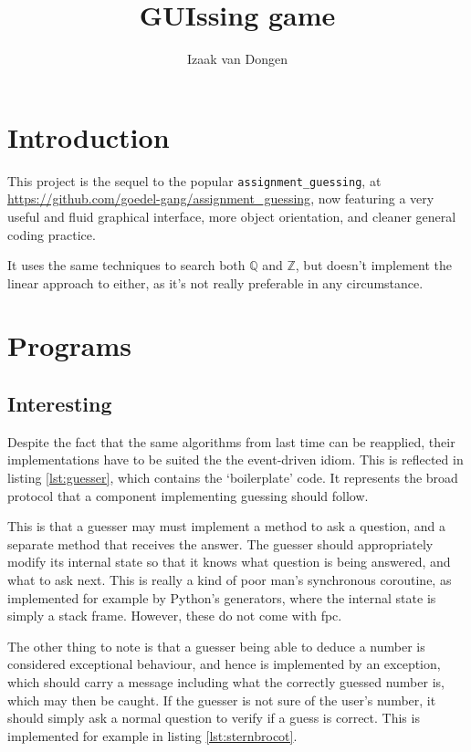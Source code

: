 \documentclass[a4paper,11pt]{article}
\title{GUIssing game}
\author{Izaak van Dongen}
\begin{document}
    \maketitle\thispagestyle{empty} %
    \tableofcontents
    \listoflistings

    \section{Introduction}

    This project is the sequel to the popular \texttt{assignment\_guessing}, at
    \url{https://github.com/goedel-gang/assignment_guessing}, now featuring a
    very useful and fluid graphical interface, more object orientation, and
    cleaner general coding practice.

    It uses the same techniques to search both \(\mathbb{Q}\) and
    \(\mathbb{Z}\), but doesn't implement the linear approach to either, as it's
    not really preferable in any circumstance.

    \section{Programs}

    \subsection{Interesting}

    Despite the fact that the same algorithms from last time can be reapplied,
    their implementations have to be suited the the event-driven idiom. This is
    reflected in listing \ref{lst:guesser}, which contains the `boilerplate'
    code. It represents the broad protocol that a component implementing
    guessing should follow.

    This is that a guesser may must implement a method to ask a question, and a
    separate method that receives the answer. The guesser should appropriately
    modify its internal state so that it knows what question is being answered,
    and what to ask next. This is really a kind of poor man's synchronous
    coroutine, as implemented for example by Python's generators, where the
    internal state is simply a stack frame. However, these do not come with fpc.

    The other thing to note is that a guesser being able to deduce a number is
    considered exceptional behaviour, and hence is implemented by an exception,
    which should carry a message including what the correctly guessed number is,
    which may then be caught. If the guesser is not sure of the user's number,
    it should simply ask a normal question to verify if a guess is correct. This
    is implemented for example in listing \ref{lst:sternbrocot}.
\end{document}

